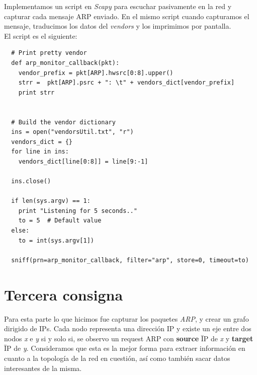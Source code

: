 \documentclass[a4paper]{article}
\begin{document}
Implementamos un script en \textit{Scapy} para escuchar pasivamente en la red y capturar cada mensaje ARP enviado. En el mismo script cuando capturamos el mensaje, traducimos los datos del \textit{vendors} y los imprimimos por pantalla.\\

El script es el siguiente:

\begin{verbatim}
  # Print pretty vendor
  def arp_monitor_callback(pkt):
    vendor_prefix = pkt[ARP].hwsrc[0:8].upper()
    strr =  pkt[ARP].psrc + ": \t" + vendors_dict[vendor_prefix]
    print strr


  # Build the vendor dictionary
  ins = open("vendorsUtil.txt", "r")
  vendors_dict = {}
  for line in ins:
    vendors_dict[line[0:8]] = line[9:-1] 
   
  ins.close()
	
  if len(sys.argv) == 1:
    print "Listening for 5 seconds.."
    to = 5  # Default value
  else:
    to = int(sys.argv[1]) 

  sniff(prn=arp_monitor_callback, filter="arp", store=0, timeout=to)	
\end{verbatim}

\newpage

\section{Tercera consigna}

Para esta parte lo que hicimos fue capturar los paquetes \textit{ARP}, y crear un grafo dirigido de IPs. Cada nodo representa una dirección IP y existe un eje entre dos nodos \textit{x} e \textit{y} si y solo si, se observo un request ARP con \textbf{source} \= IP de \textit{x} y \textbf{target} \= IP de \textit{y}. 
 Consideramos que esta es la mejor forma para extraer información en cuanto a la topología de la red en cuestión, así como también sacar datos interesantes de la misma. \\
 
\end{document}
